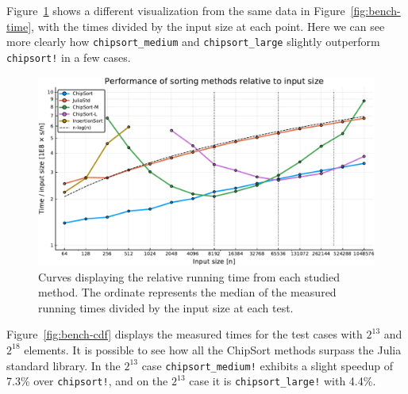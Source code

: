 \documentclass{juliacon}
\begin{document}
Figure~\ref{fig:bench-curves} shows a different visualization from the same data in Figure~\ref{fig:bench-time}, with the times divided by the input size at each point. Here we can see more clearly how {\tt chipsort\_medium} and {\tt chipsort\_large} slightly outperform {\tt chipsort!} in a few cases.

\begin{figure}[htb]
\centerline{\includegraphics[width=0.75\linewidth]{fig/chipsort-bench-curves.pdf}}
\caption{Curves displaying the relative running time from each studied method. The ordinate represents the median of the measured running times divided by the input size at each test.}
\label{fig:bench-curves}
\end{figure}

Figure~\ref{fig:bench-cdf} displays the measured times for the test cases with $2^{13}$ and $2^{18}$ elements. It is possible to see how all the ChipSort methods surpass the Julia standard library. In the $2^{13}$ case {\tt chipsort\_medium!} exhibits a slight speedup of 7.3\% over {\tt chipsort!}, and on the $2^{13}$ case it is {\tt chipsort\_large!} with 4.4\%.
\end{document}
